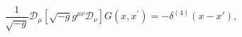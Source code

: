 \begin{equation}
\label{Gr}
\frac{1}{\sqrt{-g}}{\mathcal{D}}_{\mu}\left[\sqrt{-g}g^{\mu\nu}{\mathcal{D}}_{\nu}
\right]G(x,x^{'})=-\delta^{(4)}(x-x'),
\label{5}
\end{equation} 

